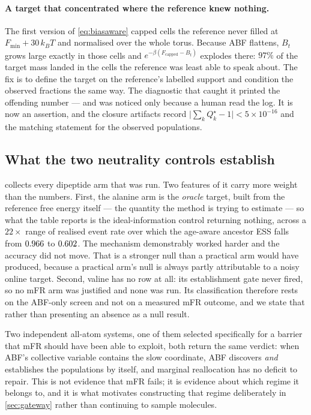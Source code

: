 \paragraph{A target that concentrated where the reference knew nothing.} The first version of
\cref{eq:biasaware} capped cells the reference never filled at $F_{\min}+30\,k_BT$ and
normalised over the whole torus. Because ABF flattens, $B_t$ grows large exactly in those
cells and $e^{-\beta(F_{\mathrm{capped}}-B_t)}$ explodes there: $97\%$ of the target mass
landed in the cells the reference was least able to speak about. The fix is to define the
target on the reference's labelled support and condition the observed fractions the same way.
The diagnostic that caught it printed the offending number --- and was noticed only because a
human read the log. It is now an assertion, and the closure artifacts record
$\lvert\sum_k Q^\star_k - 1\rvert < 5\times10^{-16}$ and the matching statement for the
observed populations.

\subsection{What the two neutrality controls establish}


 collects every dipeptide arm that was run. Two features of it
carry more weight than the numbers. First, the alanine arm is the \emph{oracle} target, built
from the reference free energy itself --- the quantity the method is trying to estimate --- so
what the table reports is the ideal-information control returning nothing, across a
$22\times$ range of realised event rate over which the age-aware ancestor ESS falls from
$0.966$ to $0.602$. The mechanism demonstrably worked harder and the accuracy did not
move. That is a stronger null than a practical arm would have produced, because a practical
arm's null is always partly attributable to a noisy online target. Second, valine has no row
at all: its establishment gate never fired, so no mFR arm was justified and none was run. Its
classification therefore rests on the ABF-only screen and not on a measured mFR outcome, and
we state that rather than presenting an absence as a null result.

Two independent all-atom systems, one of them selected specifically for a barrier that mFR
should have been able to exploit, both return the same verdict: when ABF's collective
variable contains the slow coordinate, ABF discovers \emph{and} establishes the populations
by itself, and marginal reallocation has no deficit to repair. This is not evidence that mFR
fails; it is evidence about which regime it belongs to, and it is what motivates constructing
that regime deliberately in \cref{sec:gateway} rather than continuing to sample molecules.

